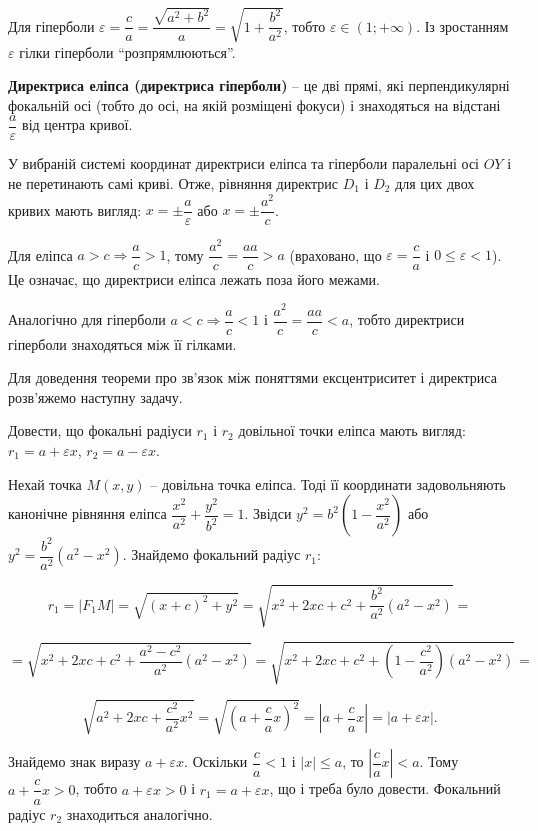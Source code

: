 Для гіперболи $\varepsilon = \dfrac{c}{a} = \dfrac{\sqrt{a^2 + b^2}}{a} = \sqrt{1+\dfrac{b^2}{a^2}}$,
тобто $\varepsilon \in (1;+\infty)$. Із зростанням $\varepsilon$ гілки гіперболи “розпрямлюються”.

\begin{definition}[Директриса]
	\textbf{Директриса еліпса (директриса гіперболи)} -- це дві прямі, які
	перпендикулярні фокальній осі (тобто до осі, на якій розміщені фокуси) і
	знаходяться на відстані $\dfrac{a}{\varepsilon}$ від центра кривої.
\end{definition}

У вибраній системі координат директриси еліпса та гіперболи паралельні осі
$OY$ і не перетинають самі криві. Отже, рівняння директрис $D_1$ і $D_2$ для цих двох
кривих мають вигляд: $x = \pm\dfrac{a}{\varepsilon}$ або $x = \pm\dfrac{a^2}{c}$.

Для еліпса $a > c \Rightarrow \dfrac{a}{c} > 1$, тому $\dfrac{a^2}{c} = \dfrac{aa}{c} > a$
(враховано, що $\varepsilon = \dfrac{c}{a}$ і $0 \leqslant \varepsilon < 1$). Це
означає, що директриси еліпса лежать поза його межами.

Аналогічно для гіперболи $a < c \Rightarrow \dfrac{a}{c} < 1$ і $\dfrac{a^2}{c} = \dfrac{aa}{c} < a$,
тобто директриси гіперболи знаходяться між її гілками.

Для доведення теореми про зв’язок між поняттями ексцентриситет і
директриса роз\-в’я\-же\-мо наступну задачу.

\begin{problem}
	Довести, що фокальні радіуси $r_1$ і $r_2$ довільної точки еліпса мають
	вигляд: $r_1 = a + \varepsilon x$, $r_2 = a - \varepsilon x$. 
\end{problem}
\begin{solution}
	Нехай точка $M(x,y)$ -- довільна точка еліпса. Тоді її координати
	задовольняють канонічне рівняння еліпса $\dfrac{x^2}{a^2} + \dfrac{y^2}{b^2} = 1$. Звідси $y^2 = b^2(1-\dfrac{x^2}{a^2})$
	або $y^2 = \dfrac{b^2}{a^2}(a^2-x^2)$. Знайдемо фокальний радіус $r_1$:

	$$r_1 = |F_1M| = \sqrt{(x+c)^2 + y^2} = \sqrt{x^2 + 2xc + c^2 + \dfrac{b^2}{a^2}(a^2-x^2)} =$$

	$$= \sqrt{x^2 + 2xc + c^2 + \dfrac{a^2-c^2}{a^2}(a^2-x^2)} = \sqrt{x^2 + 2xc + c^2 + (1-\dfrac{c^2}{a^2})(a^2-x^2)} =$$

	$$\sqrt{a^2 + 2xc + \dfrac{c^2}{a^2}x^2} = \sqrt{(a + \dfrac{c}{a}x)^2} = |a + \dfrac{c}{a}x| = |a + \varepsilon x|.$$

	Знайдемо знак виразу $a + \varepsilon x$. Оскільки $\dfrac{c}{a} < 1$ і $|x| \leqslant a$, то $|\dfrac{c}{a}x| < a$.
	Тому $a + \dfrac{c}{a}x > 0$, тобто $a + \varepsilon x > 0$ і $r_1 = a + \varepsilon x$, що і треба було довести. Фокальний
	радіус $r_2$ знаходиться аналогічно.
\end{solution}


